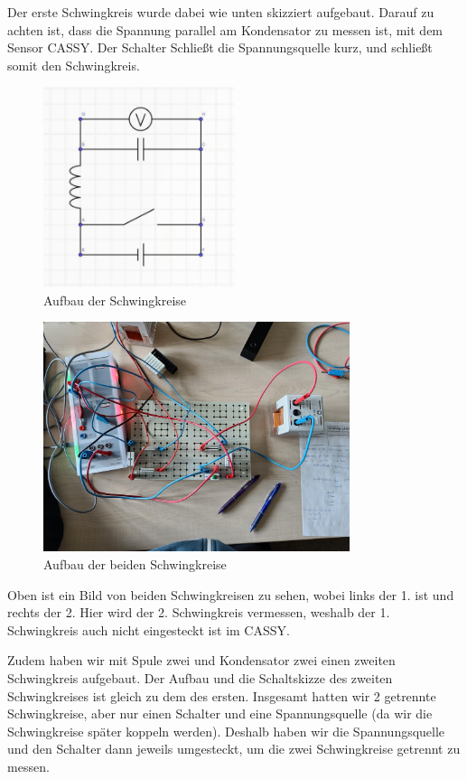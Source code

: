 \documentclass[twoside]{protokoll}
\begin{document}
Der erste Schwingkreis wurde dabei wie unten skizziert aufgebaut.
Darauf zu achten ist, dass die Spannung parallel am Kondensator zu messen ist, mit dem Sensor CASSY. Der Schalter Schließt die Spannungsquelle kurz, und schließt somit den Schwingkreis.
\begin{figure}[H]
    \centering
    \includegraphics[width=0.5\textwidth]{schaltplan-einzelschwingkreis.pdf}
    \caption{Aufbau der Schwingkreise}
\end{figure}
\begin{figure}[H]
    \centering
    \includegraphics[width=0.8\textwidth]{bilder/schwingkreis2.pdf}
    \caption{Aufbau der beiden Schwingkreise}
\end{figure}

Oben ist ein Bild von beiden Schwingkreisen zu sehen, wobei links der 1. ist und rechts der 2.
Hier wird der 2. Schwingkreis vermessen, weshalb der 1. Schwingkreis auch nicht eingesteckt ist im CASSY.
 
Zudem haben wir mit Spule zwei und Kondensator zwei einen zweiten Schwingkreis aufgebaut.
Der Aufbau und die Schaltskizze des zweiten Schwingkreises ist gleich zu dem des ersten.
Insgesamt hatten wir 2 getrennte Schwingkreise, aber nur einen Schalter und eine Spannungsquelle (da wir die Schwingkreise später koppeln werden).
Deshalb haben wir die Spannungsquelle und den Schalter dann jeweils umgesteckt, um die zwei Schwingkreise getrennt zu messen.
\end{document}
